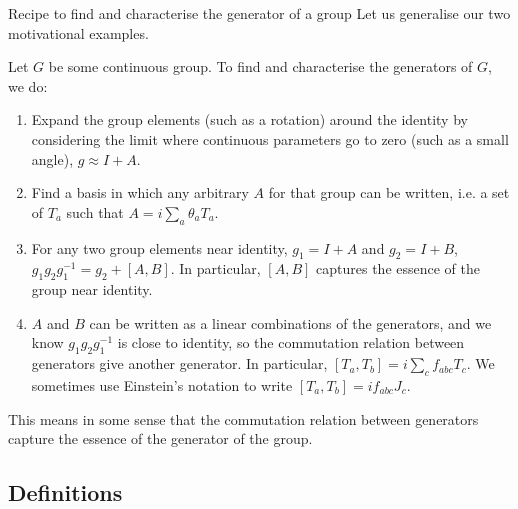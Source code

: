 \documentclass[a4paper]{article}
\begin{document}
\begin{parag}{Recipe to find and characterise the generator of a group}
    Let us generalise our two motivational examples.

    Let $G$ be some continuous group. To find and characterise the generators of $G$, we do:
    \begin{enumerate}[left=0pt]
        \item Expand the group elements (such as a rotation) around the identity by considering the limit where continuous parameters go to zero (such as a small angle), $g \approx I + A$.
        \item Find a basis in which any arbitrary $A$ for that group can be written, i.e. a set of $T_a$ such that $A = i \sum_{a} \theta_a T_a$.
        \item For any two group elements near identity, $g_1 = I+A$ and $g_2 = I+B$, $g_1 g_2 g_1^{-1} = g_2 + \left[A, B\right]$. In particular, $\left[A, B\right]$ captures the essence of the group near identity.
        \item $A$ and $B$ can be written as a linear combinations of the generators, and we know $g_1 g_2 g_1^{-1}$ is close to identity, so the commutation relation between generators give another generator. In particular, $\left[T_a, T_b\right] = i \sum_{c} f_{a b c} T_c$.  We sometimes use Einstein's notation to write $\left[T_a, T_b\right] = i f_{abc} J_c$.
    \end{enumerate}
    
    This means in some sense that the commutation relation between generators capture the essence of the generator of the group. 
\end{parag}

\subsection{Definitions}
\end{document}
